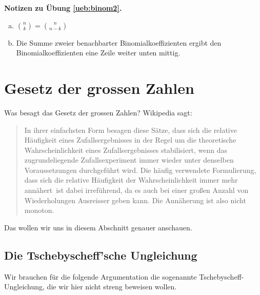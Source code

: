 \documentclass[%
11pt,%
twoside,%
titlepage,%
german,%
headsepline%
]{scrartcl}
\newcounter{theo}[section]\setcounter{theo}{0}
\newcommand{\concatueb}[1]{ueb:#1}%
\newcommand{\concatlsg}[1]{lsg:#1}%
\newenvironment{lsg}[1]{%
    \par\noindent\textbf{Notizen zu Übung \ref{\concatueb{#1}}.}%
    \label{\concatlsg{#1}}
}{%
    \par%
}
\begin{document}
\begin{lsg}{binom2}
\begin{enumerate}[a)]
\item $\binom{n}{k}=\binom{n}{n-k}$
\item Die Summe zweier benachbarter Binomialkoeffizienten ergibt den Binomialkoeffizienten eine Zeile weiter unten mittig.
\end{enumerate}
\end{lsg}

\clearpage





\clearpage

\section{Gesetz der grossen Zahlen}

Was besagt das Gesetz der grossen Zahlen? Wikipedia sagt:

\begin{quote}
    In ihrer einfachsten Form besagen diese Sätze, dass sich die relative Häufigkeit eines Zufallsergebnisses in der Regel um die theoretische Wahrscheinlichkeit eines Zufallsergebnisses stabilisiert, wenn das zugrundeliegende Zufallsexperiment immer wieder unter denselben Voraussetzungen durchgeführt wird. Die häufig verwendete Formulierung, dass sich die relative Häufigkeit der Wahrscheinlichkeit \glqq immer mehr annähert\grqq\ ist dabei irreführend, da es auch bei einer großen Anzahl von Wiederholungen Ausreisser geben kann. Die Annäherung ist also nicht monoton.
\end{quote}

Das wollen wir uns in diesem Abschnitt genauer anschauen.

\subsection{Die Tschebyscheff'sche Ungleichung}

Wir brauchen für die folgende Argumentation die sogenannte Tschebyscheff-Ungleichung, die wir hier nicht streng beweisen wollen.
\end{document}
